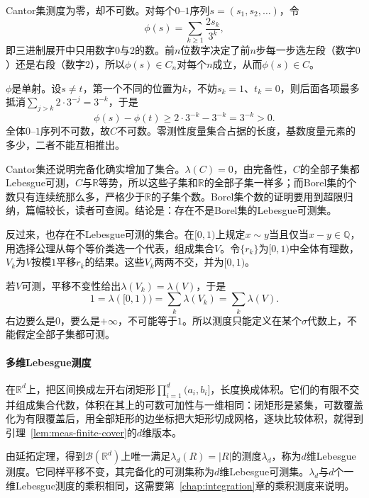 Cantor集测度为零，却不可数。对每个$0$--$1$序列$s=(s_1,s_2,\dots)$，令
\[
 \phi(s)=\sum_{k\geq1}\frac{2s_k}{3^k},
\]
即三进制展开中只用数字$0$与$2$的数。前$n$位数字决定了前$n$步每一步选左段（数字$0$）还是右段（数字$2$），所以$\phi(s)\in C_n$对每个$n$成立，从而$\phi(s)\in C$。

$\phi$是单射。设$s\neq t$，第一个不同的位置为$k$，不妨$s_k=1$、$t_k=0$，则后面各项最多抵消$\sum_{j>k}2\cdot3^{-j}=3^{-k}$，于是
\[
 \phi(s)-\phi(t)\geq2\cdot3^{-k}-3^{-k}=3^{-k}>0.
\]
全体$0$--$1$序列不可数，故$C$不可数。零测性度量集合占据的长度，基数度量元素的多少，二者不能互相推出。

Cantor集还说明完备化确实增加了集合。$\lambda(C)=0$，由完备性，$C$的全部子集都Lebesgue可测，$C$与$\mathbb R$等势，所以这些子集和$\mathbb R$的全部子集一样多；而Borel集的个数只有连续统那么多，严格少于$\mathbb R$的子集个数。Borel集个数的证明要用到超限归纳，篇幅较长，读者可查阅。结论是：存在不是Borel集的Lebesgue可测集。

反过来，也存在不Lebesgue可测的集合。在$[0,1)$上规定$x\sim y$当且仅当$x-y\in\mathbb Q$，用选择公理从每个等价类选一个代表，组成集合$V$。令$\{r_k\}$为$[0,1)$中全体有理数，$V_k$为$V$按模$1$平移$r_k$的结果。这些$V_k$两两不交，并为$[0,1)$。

若$V$可测，平移不变性给出$\lambda(V_k)=\lambda(V)$，于是
\[
 1=\lambda([0,1))=\sum_k\lambda(V_k)=\sum_k\lambda(V).
\]
右边要么是$0$，要么是$+\infty$，不可能等于$1$。所以测度只能定义在某个$\sigma$代数上，不能假定全部子集都可测。

\paragraph{多维Lebesgue测度}
在$\mathbb R^d$上，把区间换成左开右闭矩形$\prod_{i=1}^d(a_i,b_i]$，长度换成体积。它们的有限不交并组成集合代数，体积在其上的可数可加性与一维相同：闭矩形是紧集，可数覆盖化为有限覆盖后，用全部矩形的边坐标把大矩形切成网格，逐块比较体积，就得到引理~\ref{lem:meas-finite-cover}的$d$维版本。

由延拓定理，得到$\mathcal B(\mathbb R^d)$上唯一满足$\lambda_d(R)=\lvert R\rvert$的测度$\lambda_d$，称为$d$维Lebesgue测度。它同样平移不变，其完备化的可测集称为$d$维Lebesgue可测集。$\lambda_d$与$d$个一维Lebesgue测度的乘积相同，这需要第~\ref{chap:integration}章的乘积测度来说明。
